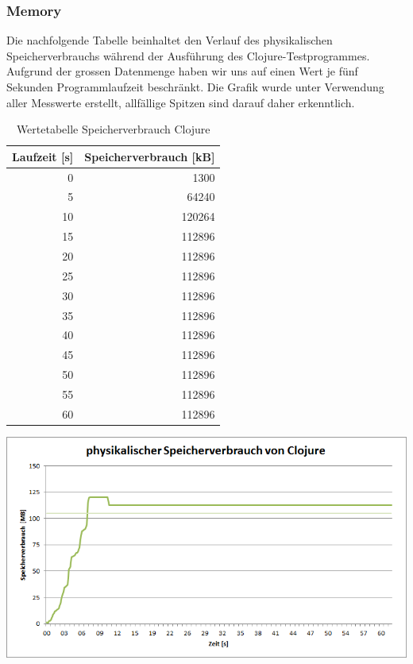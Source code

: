 \documentclass{fancydocument}
\begin{document}
\subsubsection{Memory}
Die nachfolgende Tabelle beinhaltet den Verlauf des physikalischen Speicherverbrauchs während der Ausführung des Clojure-Testprogrammes. Aufgrund der grossen Datenmenge haben wir uns auf einen Wert je fünf Sekunden Programmlaufzeit beschränkt. Die Grafik wurde unter Verwendung aller Messwerte erstellt, allfällige Spitzen sind darauf daher erkenntlich.
\begin{table}[h!]
\centering
\begin{tabular}{|r|r|} \hline
\textbf{Laufzeit [s]} & \textbf{Speicherverbrauch [kB]}\\
\hline
0 & 1300\\
\hline
5 & 64240\\
\hline
10 & 120264\\
\hline
15 & 112896\\
\hline
20 & 112896\\
\hline
25 & 112896\\
\hline
30 & 112896\\
\hline
35 & 112896\\
\hline
40 & 112896\\
\hline
45 & 112896\\
\hline
50 & 112896\\
\hline
55 & 112896\\
\hline
60 & 112896\\
\hline
\end{tabular}
\caption{Wertetabelle Speicherverbrauch Clojure}
\end{table}
\begin{center}
\includegraphics[width=\linewidth]{bilder/MemoryClojure.png}
\end{center}
\end{document}
